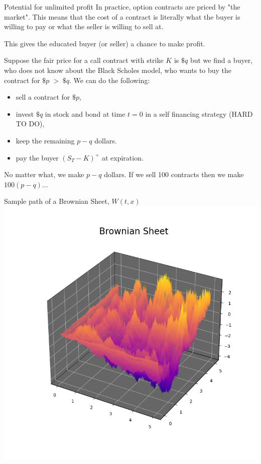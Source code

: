 \documentclass{beamer}%
\numberwithin{equation}{section}
\begin{document}
\begin{frame}{Potential for unlimited profit}
In practice, option contracts are priced by "the market". This means that the cost of a contract is literally what the buyer is willing to pay or what the seller is willing to sell at. 

\vspace{.1in}

This gives the educated buyer (or seller) a chance to make profit. 

\vspace{.1in}

Suppose the fair price for a call contract with strike $K$ is $\$q$ but we find a buyer, who does not know about the Black Scholes model, who wants to buy the contract for $\$p \; > \; \$q$. We can do the following:
	\begin{itemize}
		\item sell a contract for $\$p$,
		\item invest $\$q$ in stock and bond at time $t=0$ in a self financing strategy (HARD TO DO),
		\item keep the remaining $p-q$ dollars.
		\item pay the buyer $(S_T -K)^+$ at expiration.
	\end{itemize}
No matter what, we make $p - q$ dollars. If we sell 100 contracts then we make $100(p-q)$...

\end{frame}

\begin{frame}{Sample path of a Brownian Sheet, $W(t,x)$}
	\centering
	\includegraphics[scale=.5]{bsheet4.png}
\end{frame}
\end{document}
